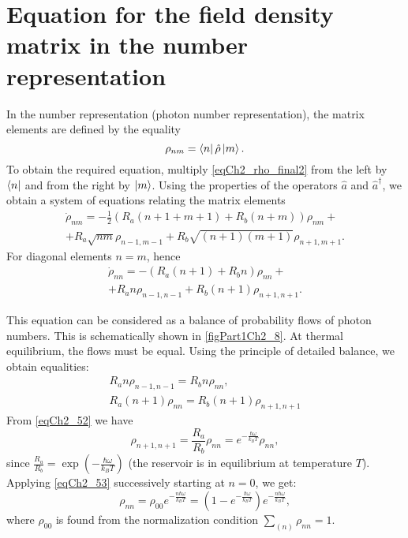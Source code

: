 \section{Equation for the field density matrix in the number representation}
\label{ch2_7}
In the number representation (photon number representation), the matrix elements are defined by the equality
\[
\rho_{nm} = \bra{n}\hat{\rho}\ket{m}.
\]
To obtain the required equation, multiply
\eqref{eqCh2_rho_final2} from the left by $\bra{n}$ and from the right by  
$\ket{m}$. Using
the properties of the operators $\hat{a}$ and $\hat{a}^{\dag}$, we obtain a system
of equations relating the matrix elements 
\begin{eqnarray}
\dot{\rho}_{nm} = - \frac{1}{2}
\left(
R_a\left(n + 1 + m + 1\right) + 
R_b\left(n + m\right)
\right)\rho_{nm} +
\nonumber \\
+ 
R_a\sqrt{nm}\rho_{n - 1, m - 1} +
R_b\sqrt{\left(n + 1\right)\left(m + 1\right)}\rho_{n + 1, m + 1}.
\label{eqCh2_task5}
\end{eqnarray}
For diagonal elements $n = m$, hence
\begin{eqnarray}
\dot{\rho}_{nn} = - 
\left(
R_a\left(n + 1\right) + 
R_b n
\right)\rho_{nn} +
\nonumber \\
+ 
R_a n \rho_{n - 1, n - 1} +
R_b\left(n + 1\right)\rho_{n + 1, n + 1}.
\label{eqCh2_51}
\end{eqnarray}



This equation can be considered as a balance of probability flows
of photon numbers. This is schematically shown in \autoref{figPart1Ch2_8}. At
thermal equilibrium, the flows must be equal. Using
the principle of detailed balance, we obtain equalities: 
\begin{eqnarray}
R_a n \rho_{n - 1, n - 1} = R_b n \rho_{nn},
\nonumber \\
R_a \left(n + 1\right) \rho_{n n} = R_b 
\left(n + 1\right) \rho_{n + 1, n + 1}
\label{eqCh2_52}
\end{eqnarray}
From \eqref{eqCh2_52} we have
\begin{equation}
\rho_{n + 1, n + 1} = \frac{R_a}{R_b}\rho_{nn} = 
e^{-\frac{\hbar \omega}{k_B T}}\rho_{nn},
\label{eqCh2_53}
\end{equation}
since  
\(
\frac{R_a}{R_b} = 
\exp \left(-\frac{\hbar \omega}{k_B T}\right)
\)
(the reservoir is in equilibrium at temperature
$T$). Applying \eqref{eqCh2_53} successively starting at $n=0$, 
we get:  
\begin{equation}
\rho_{nn} = \rho_{00} 
e^{-\frac{n \hbar \omega}{k_B T}} =
\left(1 - e^{-\frac{\hbar \omega}{k_B T}}\right) 
e^{-\frac{n \hbar \omega}{k_B T}},
\end{equation}
where $\rho_{00}$ is found from the normalization condition $\sum_{(n)}\rho_{nn} = 1$.

